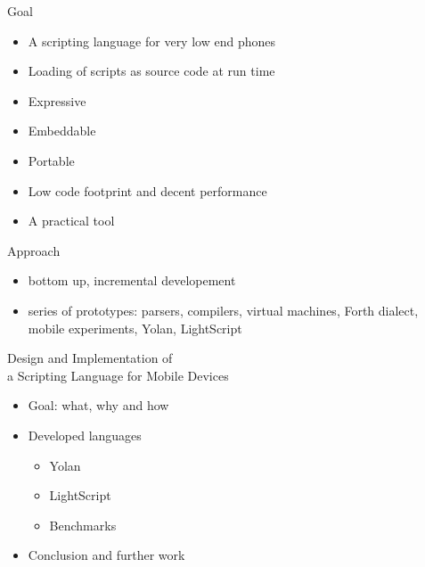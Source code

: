 \documentclass[a4paper,landscape]{slides}
\begin{document}
\begin{slide}
	{\large 
            Goal
	\\ \mbox{}}
	\begin{itemize} \addtolength{\itemsep}{-\baselineskip}
            \item A scripting language for very low end phones
            \item Loading of scripts as source code at run time
            \item Expressive
            \item Embeddable
            \item Portable
            \item Low code footprint and decent performance
            \item A practical tool
	\end{itemize}
\end{slide}


\begin{slide}
	{\large 
            Approach
	\\ \mbox{}}
	\begin{itemize} 
            \item bottom up, incremental developement
            \item series of prototypes: parsers, compilers, virtual machines, Forth dialect, mobile experiments, Yolan, LightScript
	\end{itemize}
\end{slide}


\begin{slide}
        {\large Design and Implementation of \\ a Scripting Language for Mobile Devices \\ \mbox{}}
\begin{itemize}\addtolength{\itemsep}{-\baselineskip}
\item Goal:  what, why and how 
\item Developed languages 
        \begin{itemize}
            \item Yolan 
            \item LightScript 
            \item Benchmarks 
        \end{itemize}
\item Conclusion and further work 
\end{itemize}
\end{slide}
\end{document}

